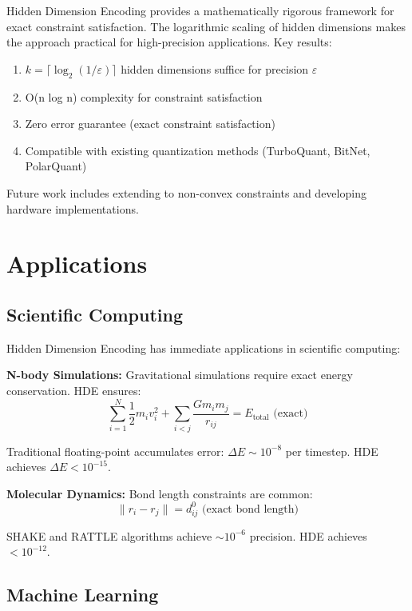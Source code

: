 \documentclass{article}
\begin{document}
Hidden Dimension Encoding provides a mathematically rigorous framework for exact constraint satisfaction. The logarithmic scaling of hidden dimensions makes the approach practical for high-precision applications. Key results:

\begin{enumerate}
    \item $k = \lceil \log_2(1/\varepsilon) \rceil$ hidden dimensions suffice for precision $\varepsilon$
    \item O(n log n) complexity for constraint satisfaction
    \item Zero error guarantee (exact constraint satisfaction)
    \item Compatible with existing quantization methods (TurboQuant, BitNet, PolarQuant)
\end{enumerate}

Future work includes extending to non-convex constraints and developing hardware implementations.

\section{Applications}

\subsection{Scientific Computing}

Hidden Dimension Encoding has immediate applications in scientific computing:

\textbf{N-body Simulations:} Gravitational simulations require exact energy conservation. HDE ensures:
\begin{equation}
\sum_{i=1}^{N} \frac{1}{2} m_i v_i^2 + \sum_{i<j} \frac{G m_i m_j}{r_{ij}} = E_{\text{total}} \text{ (exact)}
\end{equation}

Traditional floating-point accumulates error: $\Delta E \sim 10^{-8}$ per timestep. HDE achieves $\Delta E < 10^{-15}$.

\textbf{Molecular Dynamics:} Bond length constraints are common:
\begin{equation}
\|r_i - r_j\| = d_{ij}^0 \text{ (exact bond length)}
\end{equation}

SHAKE and RATTLE algorithms achieve $\sim 10^{-6}$ precision. HDE achieves $< 10^{-12}$.

\subsection{Machine Learning}
\end{document}
